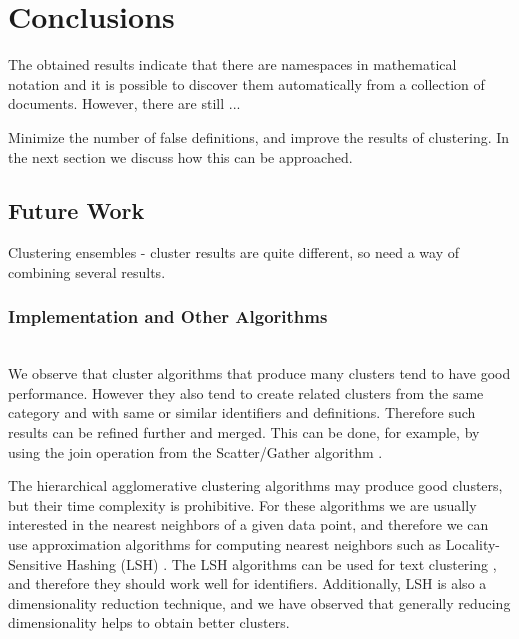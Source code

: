 \section{Conclusions}




The obtained results indicate that there are namespaces in mathematical notation
and it is possible to discover them automatically from a collection of documents. 
However, there are still ...

Minimize the number of false definitions, and improve the results of clustering. 
In the next section we discuss how this can be approached.



\subsection{Future Work}

Clustering ensembles - cluster results are quite different, so 
need a way of combining several results.

\subsubsection{Implementation and Other Algorithms}  \ \\


We observe that cluster algorithms that produce many clusters 
tend to have good performance. However they also tend to create related 
clusters from the same category and with same or similar identifiers and 
definitions. Therefore such results can be refined further and merged. 
This can be done, for example, by using the join operation from 
the Scatter/Gather algorithm \cite{cutting1992scatter}.

The hierarchical agglomerative clustering algorithms may produce good 
clusters, but their time complexity is prohibitive. For these algorithms 
we are usually interested in the nearest neighbors of a given data point,
and therefore we can use approximation algorithms for computing nearest 
neighbors such as Locality-Sensitive Hashing (LSH) \cite{leskovec2014mining}.
The LSH algorithms can be used for text clustering \cite{ravichandran2005randomized},
and therefore they should work well for identifiers. Additionally, 
LSH is also a dimensionality reduction technique, and 
we have observed that generally reducing dimensionality helps to obtain 
better clusters. 

